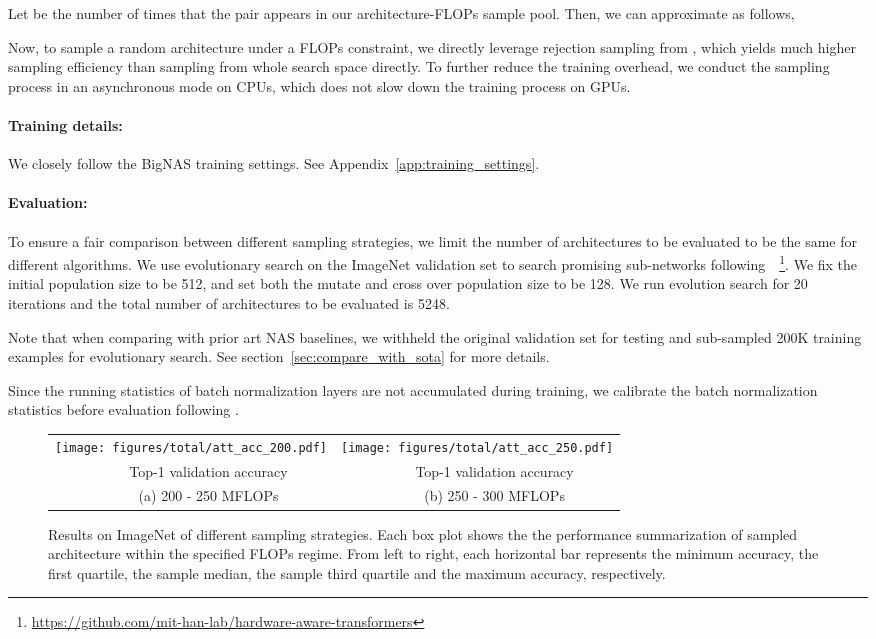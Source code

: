 \documentclass[final]{cvpr}
\theoremstyle{definition}
\begin{document}
Let   be the number of 
times that the pair  appears in our architecture-FLOPs sample pool. Then, we can approximate  as follows,

Now, to sample a random architecture under a FLOPs constraint, we directly leverage rejection sampling from , which yields much higher sampling efficiency than sampling from whole search space directly. To further reduce the training overhead, we conduct the sampling process in an asynchronous mode on CPUs, which does not slow down the training process on GPUs.


\paragraph{Training details:}
We closely follow the BigNAS \cite{yu2020bignas} training settings. 
See  Appendix~\ref{app:training_settings}. 


\paragraph{Evaluation:}
To ensure a fair comparison between different sampling strategies, 
we limit the number of architectures to be evaluated to be the same for different algorithms. 
We use evolutionary search on the ImageNet validation set to search promising sub-networks following~\cite{wang2020hat}~\footnote{\url{https://github.com/mit-han-lab/hardware-aware-transformers}}.
We fix the initial population size to be 512,
and set both the mutate and cross over population size to be 128.
We run evolution search for 20 iterations and the total number of architectures to be evaluated is 5248. 

Note that when comparing with prior art NAS baselines, we
withheld the original validation set for testing 
and sub-sampled 200K training examples for evolutionary search. 
See section~\ref{sec:compare_with_sota} for more details.

Since the running statistics of batch normalization layers are not
accumulated during training, we calibrate the batch normalization statistics before evaluation following \cite{yu2019universally}. 
 
\begin{figure*}[ht]
\centering
\setlength{\tabcolsep}{3pt}
\begin{tabular}{cc}
\texttt{[image: figures/total/att\_acc\_200.pdf]} & 
\texttt{[image: figures/total/att\_acc\_250.pdf]} \\
\small ~~~~~Top-1 validation accuracy  &\small ~~~~~Top-1 validation accuracy \\
\small ~~~~~(a)  200  - 250 MFLOPs & \small  ~~~~~(b) 250  - 300 MFLOPs \\
\end{tabular}
\caption{Results on ImageNet of different sampling strategies. 
Each box plot shows the the performance summarization of sampled architecture  within the specified FLOPs regime. From left to right,
each horizontal bar represents the minimum accuracy, the first quartile, the sample median, the sample third quartile and the maximum accuracy, respectively. 
}
\label{fig:acc_guided}
\end{figure*}
\end{document}
